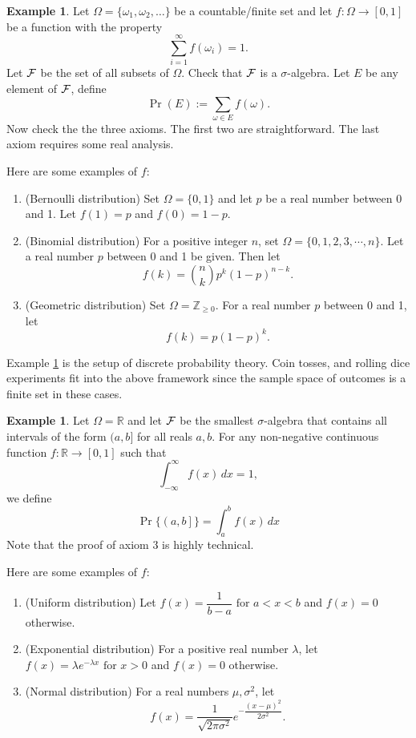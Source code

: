 \documentclass[letterpaper, 12pt]{article}
\newcommand{\1}{\mathds{1}} %
\theoremstyle{definition}
\newtheorem{example}[theorem]{Example}
\begin{document}
\begin{example}
\label{exmpl: discset}
Let $\Omega=\{\omega_1,\omega_2,\ldots\}$ be a countable/finite set and let $f:\Omega \to [0,1]$ be a function with the property 
  \[\sum_{i=1}^{\infty} f(\omega_i) = 1.\]
Let $\cal F$ be the set of all subsets of $\Omega$. Check that $\cal F$ is a $\sigma$-algebra.
Let $E$ be any element of $\cal F$, define \[\Pr(E) := \sum_{\omega \in E} f(\omega).\]
Now check the the three axioms. The first two are straightforward. The last axiom requires some real analysis. 

Here are some examples of $f$:
\begin{enumerate}
\item (Bernoulli distribution) Set $\Omega=\{0,1\}$ and let $p$ be a real number between 0 and 1. Let $f(1) = p$ and $f(0) = 1-p$.
\item (Binomial distribution) For a positive integer $n$, set $\Omega=\{0,1,2,3,\cdots,n\}$. Let a real number $p$ between 0 and 1 be given. Then let $$f(k) = \binom{n}{k} p^k (1-p)^{n-k}.$$
\item (Geometric distribution) Set $\Omega=\mathbb{Z}_{\geq 0}$. For a real number $p$ between 0 and 1, let $$f(k) = p(1-p)^{k}.$$
\end{enumerate}

\end{example}
Example \ref{exmpl: discset} is the setup of discrete probability theory. Coin tosses, and rolling dice experiments fit into the above framework since the sample space of outcomes is a finite set in these cases.


\begin{example}
\label{exmpl: contprob}
Let $\Omega=\mathbb{R}$ and let $\cal F$ be the smallest $\sigma$-algebra that contains all intervals of the form $(a,b]$ for all reals $a,b$. For any non-negative continuous function $f:\mathbb{R} \to [0,1]$ such that \[\displaystyle \int_{-\infty}^{\infty} f(x)\, dx = 1,\] we define \[\Pr\{\left(a,b\right]\} =  \int_a^b f(x)\, dx\]
Note that the proof of axiom 3 is highly technical.

Here are some examples of $f$:
\begin{enumerate}
\item (Uniform distribution) Let $f(x) = \dfrac{1}{b-a} \text{ for  } a < x < b$ and $f(x) = 0$ otherwise.
\item (Exponential distribution) For a positive real number $\lambda$, let $f(x) = \lambda e^{-\lambda x} \text{ for  } x > 0$ and $f(x) = 0$ otherwise.
\item (Normal distribution) For a real numbers $\mu,\sigma^2$, let $$f(x) = \dfrac1{\sqrt{2 \pi \sigma^2}} e^{-\dfrac{(x-\mu)^2}{2\sigma^2}}.$$
\end{enumerate}
\end{example}
\end{document}

